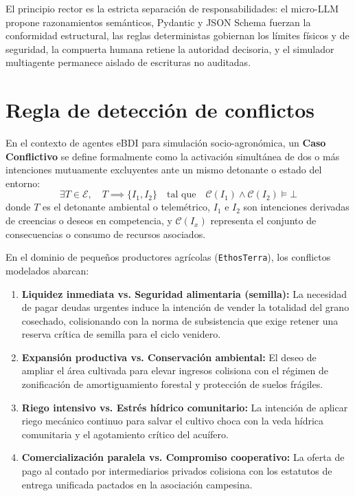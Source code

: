 \documentclass[11pt,a4paper]{article}
\begin{document}
El principio rector es la estricta separación de responsabilidades: el micro-LLM propone razonamientos semánticos, Pydantic y JSON Schema fuerzan la conformidad estructural, las reglas deterministas gobiernan los límites físicos y de seguridad, la compuerta humana retiene la autoridad decisoria, y el simulador multiagente permanece aislado de escrituras no auditadas.

\section{Regla de detección de conflictos}
En el contexto de agentes eBDI para simulación socio-agronómica, un \textbf{Caso Conflictivo} se define formalmente como la activación simultánea de dos o más intenciones mutuamente excluyentes ante un mismo detonante o estado del entorno:
\begin{equation}
    \exists T \in \mathcal{E}, \quad T \implies \{I_1, I_2\} \quad \text{tal que} \quad \mathcal{C}(I_1) \land \mathcal{C}(I_2) \models \bot
\end{equation}
donde $T$ es el detonante ambiental o telemétrico, $I_1$ e $I_2$ son intenciones derivadas de creencias o deseos en competencia, y $\mathcal{C}(I_x)$ representa el conjunto de consecuencias o consumo de recursos asociados.

En el dominio de pequeños productores agrícolas (\texttt{EthosTerra}), los conflictos modelados abarcan:
\begin{enumerate}[leftmargin=*]
    \item \textbf{Liquidez inmediata vs. Seguridad alimentaria (semilla):} La necesidad de pagar deudas urgentes induce la intención de vender la totalidad del grano cosechado, colisionando con la norma de subsistencia que exige retener una reserva crítica de semilla para el ciclo venidero.
    \item \textbf{Expansión productiva vs. Conservación ambiental:} El deseo de ampliar el área cultivada para elevar ingresos colisiona con el régimen de zonificación de amortiguamiento forestal y protección de suelos frágiles.
    \item \textbf{Riego intensivo vs. Estrés hídrico comunitario:} La intención de aplicar riego mecánico continuo para salvar el cultivo choca con la veda hídrica comunitaria y el agotamiento crítico del acuífero.
    \item \textbf{Comercialización paralela vs. Compromiso cooperativo:} La oferta de pago al contado por intermediarios privados colisiona con los estatutos de entrega unificada pactados en la asociación campesina.
\end{enumerate}
\end{document}
